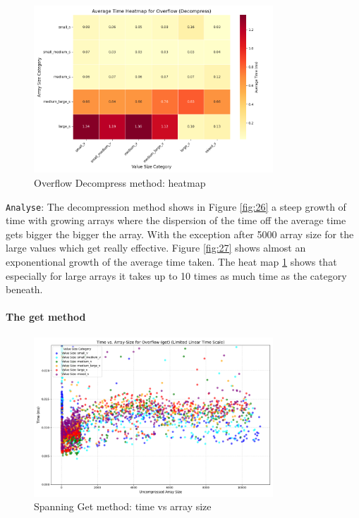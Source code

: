 \documentclass[11pt, a4paper]{article}
\begin{document}
	\begin{figure}[H]%
		\centering
		\includegraphics[width=0.8\textwidth]{Grafics/Overflow/OverflowDecompressHeat.png}
		\caption{Overflow Decompress method: heatmap}
		\label{fig:28}
	\end{figure}
	\texttt{Analyse}: The decompression method shows in Figure \ref{fig:26} a steep growth of time with growing arrays where the dispersion of the time off the average time gets bigger the bigger the array. With the exception after 5000 array size for the large values which get really effective. Figure \ref{fig:27} shows almost an exponentional growth of the average time taken. The heat map \ref{fig:28} shows that especially for large arrays it takes up to 10 times as much time as the category beneath.
	
	\paragraph{The get method}
	\begin{figure}[H]%
		\centering
		\includegraphics[width=0.8\textwidth]{Grafics/Overflow/OverflowGetTimevsSize.png}
		\caption{Spanning Get method: time vs array size}
		\label{fig:29}
		
	\end{figure}
	
\end{document}
